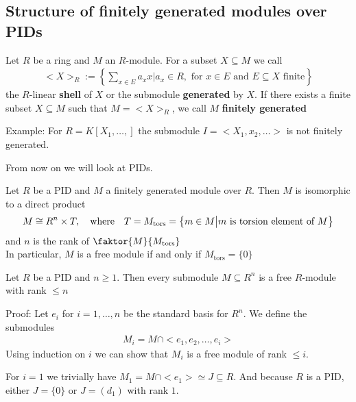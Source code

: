 \subsection{Structure of finitely generated modules over PIDs}

\begin{definition}[]
Let $R$ be a ring and $M$ an $R$-module. For a subset $X \subseteq M$ we call
\begin{align*}
	<X>_R := \left\{\sum_{x \in E}a_x x \big\vert a_x \in R, \text{ for } x \in E \text{ and } E \subseteq X \text{ finite}\right\}
\end{align*}
the $R$-linear \textbf{shell} of $X$ or the submodule \textbf{generated} by $X$. If there exists a finite subset $X \subseteq M$ such that $M = <X>_R$, we call $M$ \textbf{finitely generated}
\end{definition}

Example: For $R = K[X_{1}, \ldots,]$ the submodule $I = <X_1, x_2, \ldots>$ is not finitely generated.

From now on we will look at PIDs.
\begin{ntheorem}
	Let $R$ be a PID and $M$ a finitely generated module over $R$. Then $M$ is isomorphic to a direct product
	\begin{align*}
		M \cong R^{n} \times T , \quad \text{where} \quad T = M_{\text{tors}} = \left\{m \in M \big\vert m \text{ is torsion element of }M\right\}
	\end{align*}
	and $n$ is the rank of $\faktor{M}{M_{\text{tors}}}$\\
	In particular, $M$ is a free module if and only if $M_{\text{tors}} = \{0\}$
\end{ntheorem}


\begin{proposition}[]
Let $R$ be a PID and $n \geq 1$. Then every submodule $M \subseteq R^{n}$ is a free $R$-module with rank $\leq n$
\end{proposition}
Proof: Let $e_i$ for $i = 1, \ldots, n$ be the standard basis for $R^{n}$. We define the submodules
\begin{align*}
	M_i = M \cap <e_1, e_2, \ldots, e_i>
\end{align*}
Using induction on $i$ we can show that $M_i$ is a free module of rank $\leq i$.

For $i = 1$ we trivially have $M_1 = M \cap <e_1> \simeq J \subseteq R$. And because $R$ is a PID, either $J = \{0\}$ or $J = (d_1)$ with rank $1$.


